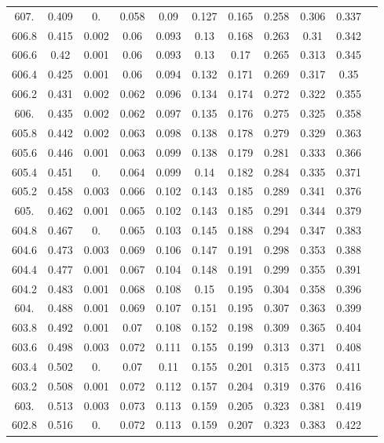\documentclass[12pt]{ctexart}
\numberwithin{equation}{section}
\begin{document}
\begin{longtable}{ccccccccccc}
607.	&	0.409	&	0.	&	0.058	&	0.09	&	0.127	&	0.165	&	0.258	&	0.306	&	0.337	\\
606.8	&	0.415	&	0.002	&	0.06	&	0.093	&	0.13	&	0.168	&	0.263	&	0.31	&	0.342	\\
606.6	&	0.42	&	0.001	&	0.06	&	0.093	&	0.13	&	0.17	&	0.265	&	0.313	&	0.345	\\
606.4	&	0.425	&	0.001	&	0.06	&	0.094	&	0.132	&	0.171	&	0.269	&	0.317	&	0.35	\\
606.2	&	0.431	&	0.002	&	0.062	&	0.096	&	0.134	&	0.174	&	0.272	&	0.322	&	0.355	\\
606.	&	0.435	&	0.002	&	0.062	&	0.097	&	0.135	&	0.176	&	0.275	&	0.325	&	0.358	\\
605.8	&	0.442	&	0.002	&	0.063	&	0.098	&	0.138	&	0.178	&	0.279	&	0.329	&	0.363	\\
605.6	&	0.446	&	0.001	&	0.063	&	0.099	&	0.138	&	0.179	&	0.281	&	0.333	&	0.366	\\
605.4	&	0.451	&	0.	&	0.064	&	0.099	&	0.14	&	0.182	&	0.284	&	0.335	&	0.371	\\
605.2	&	0.458	&	0.003	&	0.066	&	0.102	&	0.143	&	0.185	&	0.289	&	0.341	&	0.376	\\
605.	&	0.462	&	0.001	&	0.065	&	0.102	&	0.143	&	0.185	&	0.291	&	0.344	&	0.379	\\
604.8	&	0.467	&	0.	&	0.065	&	0.103	&	0.145	&	0.188	&	0.294	&	0.347	&	0.383	\\
604.6	&	0.473	&	0.003	&	0.069	&	0.106	&	0.147	&	0.191	&	0.298	&	0.353	&	0.388	\\
604.4	&	0.477	&	0.001	&	0.067	&	0.104	&	0.148	&	0.191	&	0.299	&	0.355	&	0.391	\\
604.2	&	0.483	&	0.001	&	0.068	&	0.108	&	0.15	&	0.195	&	0.304	&	0.358	&	0.396	\\
604.	&	0.488	&	0.001	&	0.069	&	0.107	&	0.151	&	0.195	&	0.307	&	0.363	&	0.399	\\
603.8	&	0.492	&	0.001	&	0.07	&	0.108	&	0.152	&	0.198	&	0.309	&	0.365	&	0.404	\\
603.6	&	0.498	&	0.003	&	0.072	&	0.111	&	0.155	&	0.199	&	0.313	&	0.371	&	0.408	\\
603.4	&	0.502	&	0.	&	0.07	&	0.11	&	0.155	&	0.201	&	0.315	&	0.373	&	0.411	\\
603.2	&	0.508	&	0.001	&	0.072	&	0.112	&	0.157	&	0.204	&	0.319	&	0.376	&	0.416	\\
603.	&	0.513	&	0.003	&	0.073	&	0.113	&	0.159	&	0.205	&	0.323	&	0.381	&	0.419	\\
602.8	&	0.516	&	0.	&	0.072	&	0.113	&	0.159	&	0.207	&	0.323	&	0.383	&	0.422	\\

\end{longtable}
\end{document}
